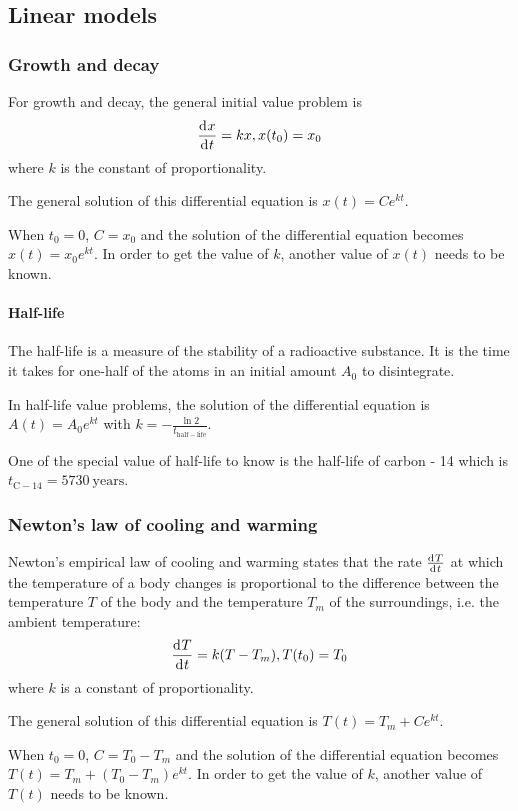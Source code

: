 \documentclass[10pt, twocolumn]{article}
\theoremstyle{definition}
\begin{document}
\subsection{Linear models}
\subsubsection*{Growth and decay}
For growth and decay, the general initial value problem is
\[
  \frac{\mathrm{d}^{} x}{\mathrm{d}^{} t} = kx, x(t_0 ) = x_0
\]
where \(k\) is the constant of proportionality.

The general solution of this differential equation is \(x(t) = Ce^{kt}\).

When \(t_0 = 0\), \(C = x_0 \) and the solution of the differential equation becomes \(x(t) = x_0 e^{kt}\).
In order to get the value of \(k\), another value of \(x(t)\) needs to be known.

\paragraph*{Half-life}
The half-life is a measure of the stability of a radioactive substance.
It is the time it takes for one-half of the atoms in an initial amount \(A_0 \) to disintegrate.

In half-life value problems, the solution of the differential equation is \(A(t) = A_0 e^{kt}\) with \(k = -\frac{\ln 2}{t_{\mathrm{half-life}}}\).

One of the special value of half-life to know is the half-life of carbon - 14 which is \(t_{\mathrm{C-14}} = \SI[scientific-notation = false]{5730}{\mathrm{years}}\).


\subsubsection*{Newton's law of cooling and warming}
Newton's empirical law of cooling and warming states that the rate \(\frac{\mathrm{d}^{} T}{\mathrm{d}^{} t}\) at which the temperature of a body changes is proportional to the difference between the temperature \(T\) of the body and the temperature \(T_m\) of the surroundings, i.e. the ambient temperature:
\[
  \frac{\mathrm{d}^{} T}{\mathrm{d}^{} t} = k(T - T_m), T(t_0 ) = T_0
\]
where \(k\) is a constant of proportionality.

The general solution of this differential equation is \(T(t) = T_m + Ce^{kt}\).

When \(t_0 = 0\), \(C = T_0 - T_m\) and the solution of the differential equation becomes \(T(t) = T_m + (T_0 - T_m)e^{kt}\).
In order to get the value of \(k\), another value of \(T(t)\) needs to be known.
\end{document}
